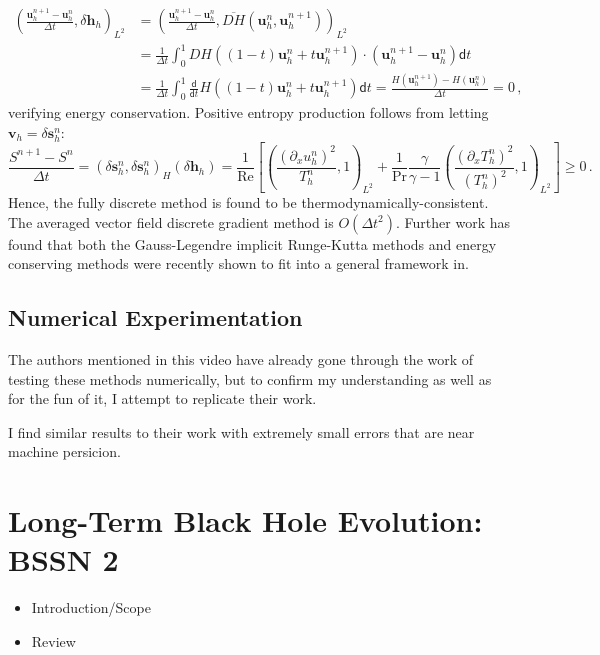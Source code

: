 \begin{equation}
\begin{aligned}
    \left(\frac{\bm{u}_h^{n+1} - \bm{u}_h^n}{\Delta t}, \delta \bm{h}_h \right)_{L^2}
    &=
    \left(\frac{\bm{u}_h^{n+1} - \bm{u}_h^n}{\Delta t}, \overline{DH}(\bm{u}_h^{n}, \bm{u}_h^{n+1}) \right)_{L^2} \\
    &=
    \frac{1}{\Delta t} \int_0^1
    DH( (1-t) \bm{u}_h^n + t \bm{u}_h^{n+1})
    \cdot (\bm{u}_h^{n+1} - \bm{u}_h^n)
     \mathsf{d} t
    \\
    &=
    \frac{1}{\Delta t} \int_0^1
    \frac{\mathsf{d}}{\mathsf{d} t} H ((1 - t) \bm{u}_h^{n} + t \bm{u}_h^{n+1}) \mathsf{d} t
    =
    \frac{H(\bm{u}_h^{n+1}) - H(\bm{u}_h^n)}{\Delta t}
    =
    0 \,,
\end{aligned}
\end{equation}
verifying energy conservation. Positive entropy production follows from letting $\bm{v}_h = \delta \bm{s}_h^n$:
\begin{equation}
    \frac{S^{n+1} - S^n}{\Delta t}
    =
    ( \delta \bm{s}_h^n, \delta \bm{s}_h^n)_H ( \delta \bm{h}_h )
    = \frac{1}{\text{Re}}
    \left[
    \left(
    \frac{ (\partial_x u_h^n)^2}{T_h^n},
    1
    \right)_{L^2}
    +
    \frac{1}{\text{Pr}} \frac{\gamma}{\gamma - 1}
    \left(
    \frac{ (\partial_x T_h^n)^2}{(T_h^n)^2},
    1
    \right)_{L^2}
    \right]
    \geq 0 \,.
\end{equation}
Hence, the fully discrete method is found to be thermodynamically-consistent. The averaged vector field discrete gradient method is $O(\Delta t^2)$. Further work has found that both the Gauss-Legendre implicit Runge-Kutta methods and energy conserving methods  were recently shown to fit into a general framework in.

\subsection{Numerical Experimentation}

The authors mentioned in this video have already gone through the work of testing these methods numerically, but to confirm my understanding as well as for the fun of it, I attempt to replicate their work.

I find similar results to their work with extremely small errors that are near machine persicion.

\section{Long-Term Black Hole Evolution: BSSN 2}
\begin{itemize}
  \item Introduction/Scope
  \item Review
\end{itemize}


